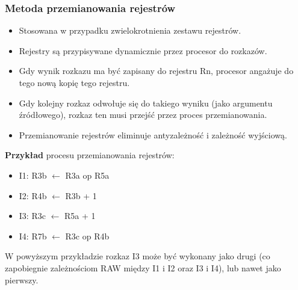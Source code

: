 \documentclass[a4paper,twoside]{article}
\begin{document}
\subsubsection{Metoda przemianowania rejestrów}
\begin{itemize}
	\item Stosowana w przypadku zwielokrotnienia zestawu rejestrów.
	\item Rejestry są przypisywane dynamicznie przez procesor do rozkazów.
	\item Gdy wynik rozkazu ma być zapisany do rejestru Rn, procesor angażuje do tego nową kopię tego rejestru.
	\item Gdy kolejny rozkaz odwołuje się do takiego wyniku (jako argumentu źródłowego), rozkaz ten musi przejść przez proces przemianowania.
	\item Przemianowanie rejestrów eliminuje antyzależność i zależność wyjściową.
\end{itemize}
\textbf{Przykład} procesu przemianowania rejestrów:
\begin{itemize}
	\item I1: R3b $ \leftarrow $ R3a op R5a
	\item I2: R4b $ \leftarrow $ R3b + 1
	\item I3: R3c $ \leftarrow $ R5a + 1
	\item I4: R7b $ \leftarrow $ R3c op R4b
\end{itemize}
W powyższym przykładzie rozkaz I3 może być wykonany jako drugi (co zapobiegnie zależnościom RAW między I1 i I2 oraz I3 i I4), lub nawet jako pierwszy.
\vfill

\end{document}
